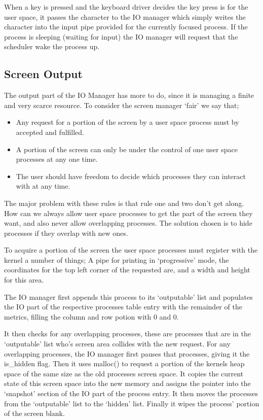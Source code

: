 \documentclass[a4paper]{report}
\begin{document}
When a key is pressed and the keyboard driver decides the key press is for the user space, it passes the character to the IO manager which simply writes the character into the input pipe provided for the currently focused process. If the process is sleeping (waiting for input) the IO manager will request that the scheduler wake the process up.

\subsection{Screen Output}

The output part of the IO Manager has more to do, since it is managing a finite and very scarce resource. To consider the screen manager `fair' we say that; 
\begin{itemize}
\item Any request for a portion of the screen by a user space process must by accepted and fulfilled.
\item A portion of the screen can only be under the control of one user space processes at any one time.
\item The user should have freedom to decide which processes they can interact with at any time.
\end{itemize}

The major problem with these rules is that rule one and two don't get along. How can we always allow user space processes to get the part of the screen they want, and also never allow overlapping processes. The solution chosen is to hide processes if they overlap with new ones.

To acquire a portion of the screen the user space processes must register with the kernel a number of things; A pipe for printing in `progressive' mode, the coordinates for the top left corner of the requested are, and a width and height for this area.

The IO manager first appends this process to its `outputable' list and populates the IO part of the respective processes table entry with the remainder of the metrics, filling the column and row potion with 0 and 0.

It then checks for any overlapping processes, these are processes that are in the `outputable' list who's screen area collides with the new request. For any overlapping processes, the IO manager first pauses that processes, giving it the is\_hidden flag. Then it uses malloc() to request a portion of the kernels heap space of the same size as the old processes screen space. It copies the current state of this screen space into the new memory and assigns the pointer into the `snapshot' section of the IO part of the process entry. It then moves the processes from the `outputable' list to the `hidden' list. Finally it wipes the process' portion of the screen blank.
\end{document}
